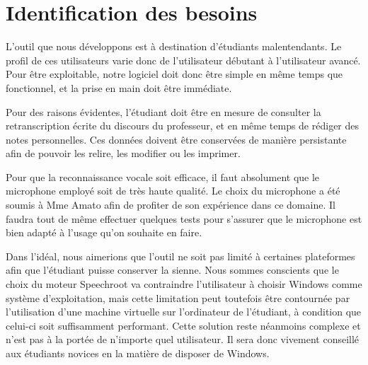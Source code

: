 \chapter{Identification des besoins}

L'outil que nous développons est à destination d'étudiants malentendants.
Le profil de ces utilisateurs varie donc de l'utilisateur débutant à l'utilisateur avancé.
Pour être exploitable, notre logiciel doit donc être simple en même temps que fonctionnel, et la prise en main doit être immédiate.

Pour des raisons évidentes, l'étudiant doit être en mesure de consulter la retranscription écrite du discours du professeur, et en même temps de rédiger des notes personnelles.
Ces données doivent être conservées de manière persistante afin de pouvoir les relire, les modifier ou les imprimer.

Pour que la reconnaissance vocale soit efficace, il faut absolument que le microphone employé soit de très haute qualité.
Le choix du microphone a été soumis à Mme Amato afin de profiter de son expérience dans ce domaine.
Il faudra tout de même effectuer quelques tests pour s'assurer que le microphone est bien adapté à l'usage qu'on souhaite en faire.

Dans l'idéal, nous aimerions que l'outil ne soit pas limité à certaines plateformes afin que l'étudiant puisse conserver la sienne.
Nous sommes conscients que le choix du moteur Speechroot va contraindre l'utilisateur à choisir Windows comme système d'exploitation, mais cette limitation peut toutefois être contournée par l'utilisation d'une machine virtuelle sur l'ordinateur de l'étudiant, à condition que celui-ci soit suffisamment performant.
Cette solution reste néanmoins complexe et n'est pas à la portée de n'importe quel utilisateur.
Il sera donc vivement conseillé aux étudiants novices en la matière de disposer de Windows.



